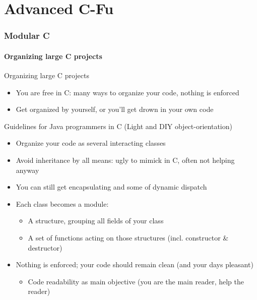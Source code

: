 \part{Advanced C-Fu}\toc
\section{Modular C}
\subsection{Organizing large C projects}
\begin{frame}[fragile]{Organizing large C projects}
  \vspace{-1.2\baselineskip}
  \begin{block}{}
    \begin{itemize} 
    \item You are free in C: many ways to organize your code, nothing is enforced
    \item Get organized by yourself, or you'll get drown in your own code
    \end{itemize}
  \end{block}\vspace{-.5\baselineskip}

  \begin{block}{Guidelines for Java programmers in C %
      {\normalsize(Light and DIY object-orientation)}}
    \begin{itemize}
    \item Organize your code as several interacting classes
    \item Avoid inheritance by all means: ugly to mimick in C, often not helping
      anyway
    \item You can still get encapsulating and some of dynamic dispatch
    \item Each class becomes a module:
      \begin{itemize}
      \item A structure, grouping all fields of your class
      \item A set of functions acting on those structures (incl. constructor \&
        destructor)
      \end{itemize}
    \item Nothing is enforced; your code should remain clean %
      {\small(and your days pleasant)}
      \begin{itemize}
      \item Code readability as main objective (you are the main reader, help
        the reader)
      \end{itemize}
    \end{itemize}
  \end{block}


\end{frame}
